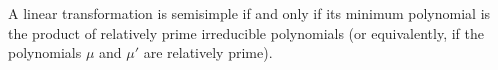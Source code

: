 A linear transformation is semisimple if and only if its minimum polynomial is the product of relatively prime irreducible polynomials (or equivalently, if the polynomials $\mu$ and $\mu'$ are relatively prime).
